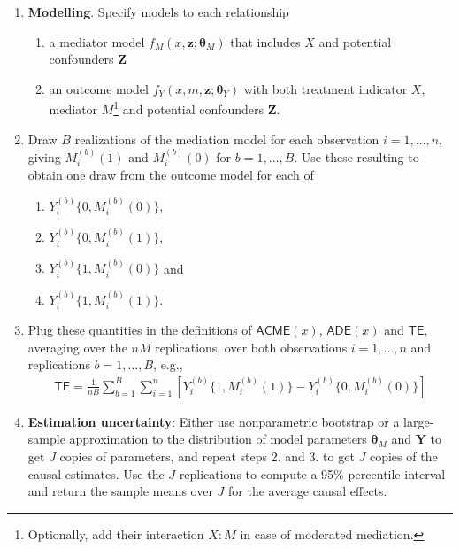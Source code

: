 \documentclass[
  11pt,
  letterpaper,
]{scrbook}
\providecommand{\tightlist}{%
  \setlength{\itemsep}{0pt}\setlength{\parskip}{0pt}}\usepackage{longtable,booktabs,array}
\theoremstyle{definition}
\theoremstyle{definition}
\theoremstyle{remark}
\begin{document}
\begin{enumerate}
\def\labelenumi{\arabic{enumi}.}
\tightlist
\item
  \textbf{Modelling}. Specify models to each relationship

  \begin{enumerate}
  \def\labelenumii{\alph{enumii}.}
  \tightlist
  \item
    a mediator model \(f_M(x, \boldsymbol{z}; \boldsymbol{\theta}_M)\)
    that includes \(X\) and potential confounders \(\boldsymbol{Z}\)
  \item
    an outcome model
    \(f_Y(x, m, \boldsymbol{z}; \boldsymbol{\theta}_Y)\) with both
    treatment indicator \(X\), mediator \(M\)\footnote{Optionally, add
      their interaction \(X:M\) in case of moderated mediation.} and
    potential confounders \(\boldsymbol{Z}\).
  \end{enumerate}
\item
  Draw \(B\) realizations of the mediation model for each observation
  \(i=1, \ldots, n\), giving \(M^{(b)}_i(1)\) and \(M^{(b)}_i(0)\) for
  \(b=1, \ldots, B\). Use these resulting to obtain one draw from the
  outcome model for each of

  \begin{enumerate}
  \def\labelenumii{\alph{enumii}.}
  \tightlist
  \item
    \(Y_{i}^{(b)}\{0, M^{(b)}_i(0)\}\),
  \item
    \(Y_{i}^{(b)}\{0, M^{(b)}_i(1)\}\),
  \item
    \(Y_{i}^{(b)}\{1, M^{(b)}_i(0)\}\) and
  \item
    \(Y_{i}^{(b)}\{1, M^{(b)}_i(1)\}\).
  \end{enumerate}
\item
  Plug these quantities in the definitions of \(\mathsf{ACME}(x)\),
  \(\mathsf{ADE}(x)\) and \(\mathsf{TE}\), averaging over the \(nM\)
  replications, over both observations \(i=1, \ldots, n\) and
  replications \(b=1, \ldots, B\), e.g., \begin{align*}
  \mathsf{TE} = \frac{1}{nB} \sum_{b=1}^B \sum_{i=1}^n \left[ Y_{i}^{(b)}\{1, M^{(b)}_i(1)\} - Y_{i}^{(b)}\{0, M^{(b)}_i(0)\}\right]
  \end{align*}
\item
  \textbf{Estimation uncertainty}: Either use nonparametric bootstrap or
  a large-sample approximation to the distribution of model parameters
  \(\boldsymbol{\theta}_M\) and \(\boldsymbol{Y}\) to get \(J\) copies
  of parameters, and repeat steps 2. and 3. to get \(J\) copies of the
  causal estimates. Use the \(J\) replications to compute a 95\%
  percentile interval and return the sample means over \(J\) for the
  average causal effects.
\end{enumerate}
\end{document}
